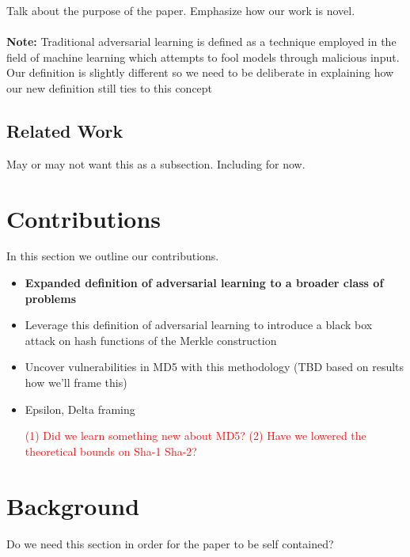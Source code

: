 Talk about the purpose of the paper. Emphasize how our work is novel. 
\\
\\
\textbf{Note:} Traditional adversarial learning is defined as a technique employed in the field of machine learning which attempts to fool models through malicious input. Our definition is slightly different so we need to be deliberate in explaining how our new definition still ties to this concept

\subsection{Related Work}
May or may not want this as a subsection. Including for now. 

\section{Contributions}
In this section we outline our contributions. 

\begin{itemize}
\item \textbf{Expanded definition of adversarial learning to a broader class of problems} 
\item Leverage this definition of adversarial learning to introduce a black box attack on hash functions of the Merkle construction 
\item Uncover vulnerabilities in MD5 with this methodology (TBD based on results how we'll frame this) 
\item Epsilon, Delta framing 

\textcolor{red}{(1) Did we learn something new about MD5? (2) Have we lowered the theoretical bounds on Sha-1 Sha-2?}
\end{itemize}

\section{Background}

Do we need this section in order for the paper to be self contained? 

